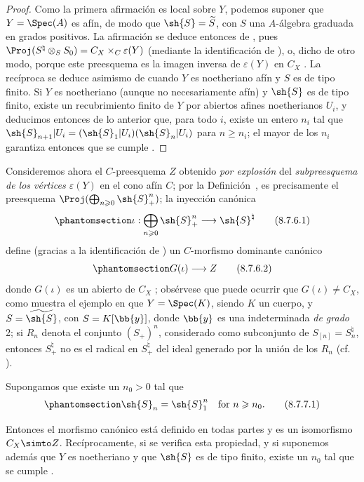 \documentclass[oneside,10pt]{amsart}
\makeatletter
\renewcommand{\geq}{\geqslant}
\newcommand{\ega@arrow}[2]{\mathchoice{#1}{#2}{#2}{#2}}
\renewcommand{\to}{\ega@arrow{\longrightarrow}{\rightarrow}}
\newcommand{\oldpage}[2][]{\marginnote{\normalfont\footnotesize\textbf{#1}~|~#2}\ignorespaces}
\let\EGAOriginalLabel\label
\renewcommand{\label}[1]{\phantomsection\EGAOriginalLabel{#1}}
\makeatother
\begin{document}
\begin{proof}
Como la primera afirmación es local sobre $Y$, podemos suponer que $Y=\Spec(A)$ es afín, de modo que $\sh{S}=\widetilde{S}$, con $S$ una $A$-álgebra graduada en grados positivos.
La afirmación se deduce entonces de , pues $\Proj(S^\natural\otimes_S S_0) = C_X\times_C\varepsilon(Y)$ (mediante la identificación de ), o, dicho de otro modo, porque este preesquema es la imagen inversa de $\varepsilon(Y)$ en $C_X$ .
La recíproca se deduce asimismo de  cuando $Y$ es noetheriano afín y $S$ es de tipo finito.
\oldpage[II]{177}
Si $Y$ es noetheriano (aunque no necesariamente afín) y $\sh{S}$ es de tipo finito, existe un recubrimiento finito de $Y$ por abiertos afines noetherianos $U_i$, y deducimos entonces de lo anterior que, para todo $i$, existe un entero $n_i$ tal que $\sh{S}_{n+1}|U_i = (\sh{S}_1|U_i)(\sh{S}_n|U_i)$ para $n\geq n_i$;
el mayor de los $n_i$ garantiza entonces que se cumple .
\end{proof}
\begin{env}[8.7.6]
\label{II.8.7.6}
Consideremos ahora el $C$-preesquema $Z$ obtenido \emph{por explosión} del \emph{subpreesquema de los vértices $\varepsilon(Y)$} en el cono afín $C$;
por la Definición~, es precisamente el preesquema $\Proj(\bigoplus_{n\geq0}\sh{S}_+^n)$;
la inyección canónica
\[
\label{II.8.7.6.1}
  \iota: \bigoplus_{n\geq0} \sh{S}_+^n \to \sh{S}^\natural
\tag{8.7.6.1}
\]
define (gracias a la identificación de ) un $C$-morfismo dominante canónico
\[
\label{II.8.7.6.2}
  G(\iota)\to Z
  \tag{8.7.6.2}
\]
donde $G(\iota)$ es un abierto de $C_X$ ;
obsérvese que puede ocurrir que $G(\iota)\neq C_X$, como muestra el ejemplo en que $Y=\Spec(K)$, siendo $K$ un cuerpo, y $S=\widetilde{\sh{S}}$, con $S=K[\bb{y}]$, donde $\bb{y}$ es una indeterminada \emph{de grado} 2;
si $R_n$ denota el conjunto $(S_+)^n$, considerado como subconjunto de $S_{[n]}=S_n^\natural$, entonces $S_+^\natural$ no es el radical en $S_+^\natural$ del ideal generado por la unión de los $R_n$ (cf. ).
\end{env}
\begin{corollary}[8.7.7]
\label{II.8.7.7}
Supongamos que existe un $n_0>0$ tal que
\[
\label{II.8.7.7.1}
  \sh{S}_n=\sh{S}_1^n
  \quad
  \text{for }n\geq n_0.
  \tag{8.7.7.1}
\]

Entonces el morfismo canónico  está definido en todas partes y es un isomorfismo $C_X\simto Z$.
Recíprocamente, si se verifica esta propiedad, y si suponemos además que $Y$ es noetheriano y que $\sh{S}$ es de tipo finito, existe un $n_0$ tal que se cumple .
\end{corollary}
\end{document}
